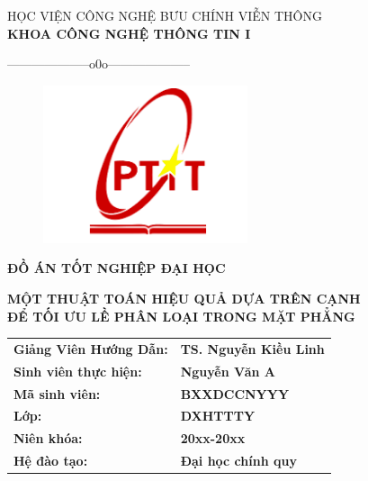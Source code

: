 \documentclass[12pt,a4paper,openany,oneside]{report}
\begin{document}

\setlength{\fboxrule}{1.5pt}
\thisfancypage{\setlength{\fboxsep}{10pt}\setlength{\shadowsize}{0pt}\doublebox}{}

\begin{titlepage}
\fontsize{14pt}{14pt}\selectfont \baselineskip 0.65cm
\thispagestyle{empty}
\begin{center}
{HỌC VIỆN CÔNG NGHỆ BƯU CHÍNH VIỄN THÔNG}\\
\textbf{\MakeUppercase{KHOA CÔNG NGHỆ THÔNG TIN I}}\\
\centerline{--------------------o0o--------------------}  
\end{center}
 

\begin{figure}[H]
	\begin{center}
		\includegraphics[width=6cm]{./logo}
	\end{center}
\end{figure} 
 
 
\vspace{0.5cm}
\begin{center}
\textbf{\MakeUppercase{\Large \bf ĐỒ ÁN TỐT NGHIỆP ĐẠI HỌC}}\\ 
\end{center} 

\vspace{1cm}
\begin{center}
	\textbf{\MakeUppercase{ \bf MỘT THUẬT TOÁN HIỆU QUẢ DỰA TRÊN CẠNH\\ ĐỂ TỐI ƯU LỀ PHÂN LOẠI TRONG MẶT PHẲNG}}\\ 
\end{center} 
\vspace{2cm}


\begin{tabular}{ll}
	{\textbf{\large{Giảng Viên Hướng Dẫn: }}} & {\textbf{\large{TS. Nguyễn Kiều Linh}}} \\
	{\textbf{\large{Sinh viên thực hiện:}}}  & {\textbf{\large{Nguyễn Văn A}}} \\
	{\textbf{\large{Mã sinh viên: }}}  & {\textbf{\large{BXXDCCNYYY}}} \\
	{\textbf{\large{Lớp:}}}   & {\textbf{\large{DXHTTTY}}}\\
	{\textbf{\large{Niên khóa:}}}   & {\textbf{\large{20xx-20xx}}}\\
	{\textbf{\large{Hệ đào tạo:}}}   & {\textbf{\large{Đại học chính quy}}}
\end{tabular}







\end{titlepage}
\end{document}
